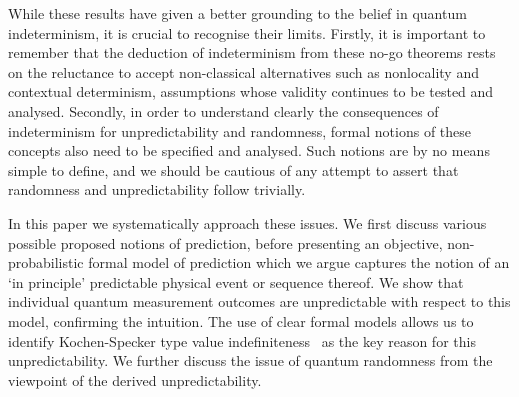 \documentclass[%
 superscriptaddress,
 preprint,
 showpacs,
 showkeys,
 preprintnumbers,
  amsmath,amssymb,
  aps,
 pra,
  longbibliography,
  floatfix,
 ]{revtex4-1}
\theoremstyle{definition}
\begin{document}
While these results have given a better grounding to the belief in quantum indeterminism, it is crucial to recognise their limits.
Firstly, it is important to remember that the deduction of indeterminism from these no-go theorems rests on the reluctance to accept non-classical alternatives such as nonlocality and contextual determinism, assumptions whose validity continues to be tested and analysed.
Secondly, in order to understand clearly the consequences of indeterminism for unpredictability and randomness, formal notions of these concepts also need to be specified and analysed.
Such notions are by no means simple to define, and we should be cautious of any attempt to assert that randomness and unpredictability follow trivially.

In this paper we systematically approach these issues.
We first discuss various possible proposed notions of prediction, before presenting an objective, non-probabilistic formal model of prediction which we argue captures the notion of an `in principle' predictable physical event or sequence thereof.
We show that individual quantum measurement outcomes are unpredictable with respect to this model, confirming the intuition.
The use of clear formal models allows us to identify Kochen-Specker type value indefiniteness~\cite{2012-incomput-proofsCJ} as the key reason for this unpredictability.
We further discuss the issue of quantum randomness from the viewpoint of the derived unpredictability.

\end{document}
